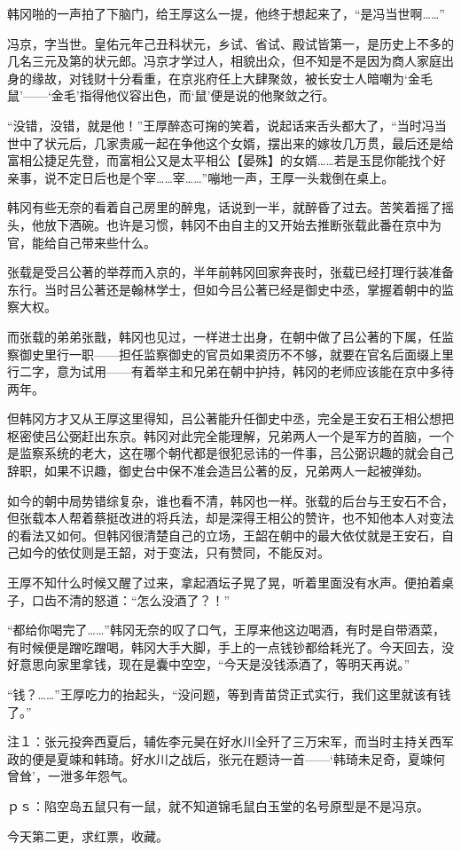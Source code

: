 韩冈啪的一声拍了下脑门，给王厚这么一提，他终于想起来了，“是冯当世啊……”

冯京，字当世。皇佑元年己丑科状元，乡试、省试、殿试皆第一，是历史上不多的几名三元及第的状元郎。冯京才学过人，相貌出众，但不知是不是因为商人家庭出身的缘故，对钱财十分看重，在京兆府任上大肆聚敛，被长安士人暗嘲为‘金毛鼠’——‘金毛’指得他仪容出色，而‘鼠’便是说的他聚敛之行。

“没错，没错，就是他！”王厚醉态可掬的笑着，说起话来舌头都大了，“当时冯当世中了状元后，几家贵戚一起在争他这个女婿，摆出来的嫁妆几万贯，最后还是给富相公捷足先登，而富相公又是太平相公【晏殊】的女婿……若是玉昆你能找个好亲事，说不定日后也是个宰……宰……”嘣地一声，王厚一头栽倒在桌上。

韩冈有些无奈的看着自己房里的醉鬼，话说到一半，就醉昏了过去。苦笑着摇了摇头，他放下酒碗。也许是习惯，韩冈不由自主的又开始去推断张载此番在京中为官，能给自己带来些什么。

张载是受吕公著的举荐而入京的，半年前韩冈回家奔丧时，张载已经打理行装准备东行。当时吕公著还是翰林学士，但如今吕公著已经是御史中丞，掌握着朝中的监察大权。

而张载的弟弟张戬，韩冈也见过，一样进士出身，在朝中做了吕公著的下属，任监察御史里行一职——担任监察御史的官员如果资历不不够，就要在官名后面缀上里行二字，意为试用——有着举主和兄弟在朝中护持，韩冈的老师应该能在京中多待两年。

但韩冈方才又从王厚这里得知，吕公著能升任御史中丞，完全是王安石王相公想把枢密使吕公弼赶出东京。韩冈对此完全能理解，兄弟两人一个是军方的首脑，一个是监察系统的老大，这在哪个朝代都是很犯忌讳的一件事，吕公弼识趣的就会自己辞职，如果不识趣，御史台中保不准会造吕公著的反，兄弟两人一起被弹劾。

如今的朝中局势错综复杂，谁也看不清，韩冈也一样。张载的后台与王安石不合，但张载本人帮着蔡挺改进的将兵法，却是深得王相公的赞许，也不知他本人对变法的看法又如何。但韩冈很清楚自己的立场，王韶在朝中的最大依仗就是王安石，自己如今的依仗则是王韶，对于变法，只有赞同，不能反对。

王厚不知什么时候又醒了过来，拿起酒坛子晃了晃，听着里面没有水声。便拍着桌子，口齿不清的怒道：“怎么没酒了？！”

“都给你喝完了……”韩冈无奈的叹了口气，王厚来他这边喝酒，有时是自带酒菜，有时候便是蹭吃蹭喝，韩冈大手大脚，手上的一点钱钞都给耗光了。今天回去，没好意思向家里拿钱，现在是囊中空空，“今天是没钱添酒了，等明天再说。”

“钱？……”王厚吃力的抬起头，“没问题，等到青苗贷正式实行，我们这里就该有钱了。”

注１：张元投奔西夏后，辅佐李元昊在好水川全歼了三万宋军，而当时主持关西军政的便是夏竦和韩琦。好水川之战后，张元在题诗一首——‘韩琦未足奇，夏竦何曾耸’，一泄多年怨气。

ｐｓ：陷空岛五鼠只有一鼠，就不知道锦毛鼠白玉堂的名号原型是不是冯京。

今天第二更，求红票，收藏。

